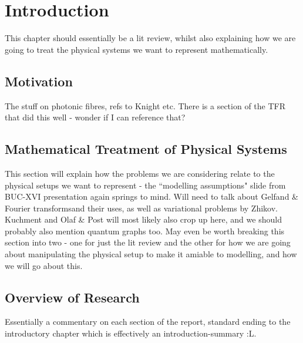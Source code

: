 \chapter{Introduction} \label{ch:Intro}
This chapter should essentially be a lit review, whilst also explaining how we are going to treat the physical systems we want to represent mathematically.

\section{Motivation} \label{sec:ProjectMotivation}
The stuff on photonic fibres, refs to Knight etc.
There is a section of the TFR that did this well - wonder if I can reference that?

\section{Mathematical Treatment of Physical Systems}
This section will explain how the problems we are considering relate to the physical setups we want to represent - the ``modelling assumptions" slide from BUC-XVI presentation again springs to mind.
Will need to talk about Gelfand \& Fourier transformsand their uses, as well as variational problems by Zhikov.
Kuchment and Olaf \& Post will most likely also crop up here, and we should probably also mention quantum graphs too.
May even be worth breaking this section into two - one for just the lit review and the other for how we are going about manipulating the physical setup to make it amiable to modelling, and how we will go about this.

\section{Overview of Research} \label{sec:ReportOverview}
Essentially a commentary on each section of the report, standard ending to the introductory chapter which is effectively an introduction-summary :L.